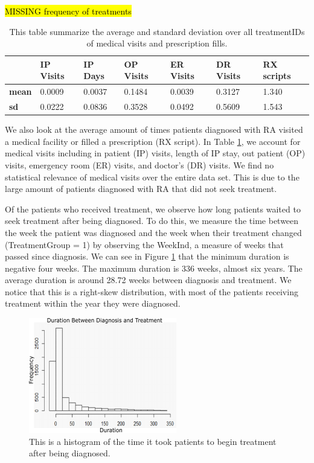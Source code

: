 \documentclass[10pt]{article}
\begin{document}
\hl{MISSING frequency of treatments} \\

\begin{table}[H]
	\centering
	\begin{tabular}{l|l|l|l|l|l|l}
		~ & \textbf{IP Visits} & \textbf{IP Days} & \textbf{OP Visits} & \textbf{ER Visits} & \textbf{DR Visits} & \textbf{RX scripts} \\
		\hline
		\textbf{mean} & 0.0009 & 0.0037 & 0.1484 & 0.0039 & 0.3127 & 1.340 \\
		\hline
		\textbf{sd} & 0.0222 & 0.0836 & 0.3528 & 0.0492 & 0.5609 & 1.543 \\
		\hline
	\end{tabular}
	\caption{This table summarize the average and standard deviation over all treatmentIDs of medical visits and prescription fills.}
	\label{medVisits}
\end{table}

We also look at the average amount of times patients diagnosed with RA visited a medical facility or filled a prescription (RX script). In Table \ref{medVisits}, we account for medical visits including in patient (IP) visits, length of IP stay, out patient (OP) visits, emergency room (ER) visits, and doctor's (DR) visits. We find no statistical relevance of medical visits over the entire data set. This is due to the large amount of patients diagnosed with RA that did not seek treatment. 

Of the patients who received treatment, we observe how long patients waited to seek treatment after being diagnosed. To do this, we measure the time between the week the patient was diagnosed and the week when their treatment changed (TreatmentGroup = 1) by observing the WeekInd, a measure of weeks that passed since diagnosis. We can see in Figure \ref{fig:TreatmentHist} that the minimum duration is negative four weeks. The maximum duration is 336 weeks, almost six years. The average duration is around 28.72 weeks between diagnosis and treatment. We notice that this is a right-skew distribution, with most of the patients receiving treatment within the year they were diagnosed.

\begin{figure}[H]
	\centering
	\includegraphics[width=.55\linewidth, scale=.5]{Figures/TreatmentHist}
	\caption{This is a histogram of the time it took patients to begin treatment after being diagnosed.}
	\label{fig:TreatmentHist}
\end{figure}
\end{document}
